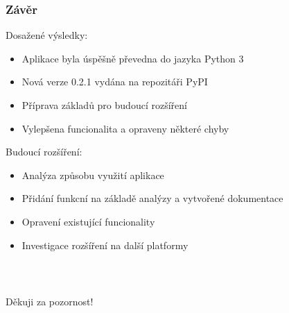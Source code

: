 \documentclass[%
  12pt,       				%
	t,                  %
	aspectratio=1610,   %
	unicode,						%
]{beamer}				    	%
\begin{document}
\begin{frame} 
	\frametitle{Závěr}
	Dosažené výsledky:
	\begin{itemize}
		\item Aplikace byla úspěšně převedna do jazyka Python 3
		\item Nová verze 0.2.1 vydána na repozitáři PyPI
		\item Příprava základů pro budoucí rozšíření
		\item Vylepšena funcionalita a opraveny některé chyby
	\end{itemize}
	Budoucí rozšíření:
	\begin{itemize}
		\item Analýza způsobu využití aplikace
		\item Přidání funkcní na základě analýzy a vytvořené dokumentace
		\item Opravení existující funcionality
		\item Investigace rozšíření na další platformy
	\end{itemize}
\end{frame}


\begin{frame}[c] 
	\frametitle{\mbox{ }}
	\begin{center}
		{\Huge Děkuji za pozornost!}
	\end{center}
\end{frame}

\end{document}
